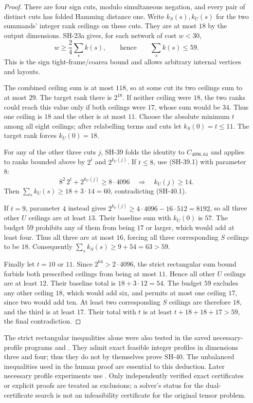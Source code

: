 \begin{proof}
There are four sign cuts, modulo simultaneous negation,
and every pair of distinct cuts has folded Hamming
distance one.  Write $k_S(s),k_U(s)$ for the two summands'
integer rank ceilings on these cuts.  They are at most
$18$ by the output dimensions.  SH-23a gives, for each
network of cost $w<30$,
\[
 w\ge\frac24\sum_s k(s),
 \qquad\text{hence}\qquad \sum_s k(s)\le59.          \tag{SH-40.1}
\]
This is the sign tight-frame/coarea bound and allows
arbitrary internal vertices and layouts.

The combined ceiling sum is at most $118$, so at some
cut its two ceilings sum to at most $29$.  The target
rank there is $2^{18}$.  If neither ceiling were $18$,
the two ranks could reach this value only if both
ceilings were $17$, whose sum would be $34$.
Thus one ceiling is $18$ and the other is at most $11$.
Choose the absolute minimum $t$ among all eight ceilings;
after relabelling terms and cuts let $k_S(0)=t\le11$.
The target rank forces $k_U(0)=18$.

For any of the other three cuts $j$, SH-39 folds the
identity to $C_{4096,64}$ and applies to ranks bounded
above by $2^t$ and $2^{k_U(j)}$.
If $t\le8$, use (SH-39.1) with parameter $8$:
\[
 8^2\,2^t+2^{k_U(j)}\ge8\cdot4096
 \quad\Longrightarrow\quad k_U(j)\ge14.
\]
Then $\sum_s k_U(s)\ge18+3\cdot14=60$, contradicting
(SH-40.1).

If $t=9$, parameter $4$ instead gives
$2^{k_U(j)}\ge4\cdot4096-16\cdot512=8192$, so all
three other $U$ ceilings are at least $13$.
Their baseline sum with $k_U(0)$ is $57$.
The budget $59$ prohibits any of them from being $17$
or larger, which would add at least four.  Thus all
three are at most $16$, forcing all three corresponding
$S$ ceilings to be $18$.  Consequently
$\sum_s k_S(s)\ge9+54=63>59$.

Finally let $t=10$ or $11$.  Since
$2^{64}>2\cdot4096$, the strict rectangular sum bound
forbids both prescribed ceilings from being at most
$11$.  Hence all other $U$ ceilings are at least $12$.
Their baseline total is $18+3\cdot12=54$.
The budget $59$ excludes any other ceiling $18$, which
would add six, and permits at most one ceiling $17$,
since two would add ten.  At least two corresponding
$S$ ceilings are therefore $18$, and the third is at
least $17$.  Their total with $t$ is at least
$t+18+18+17>59$, the final contradiction.
\end{proof}

The strict rectangular inequalities alone were also tested
in the saved necessary-profile programs
 and
.
They admit exact feasible integer profiles in dimensions
three and four; thus they do not by themselves prove
SH-40.  The unbalanced inequalities used in the human
proof are essential to this deduction.  Later necessary
profile experiments use
.
Only independently verified exact certificates or explicit
proofs are treated as exclusions; a solver's status for
the dual-certificate search is not an infeasibility
certificate for the original tensor problem.

